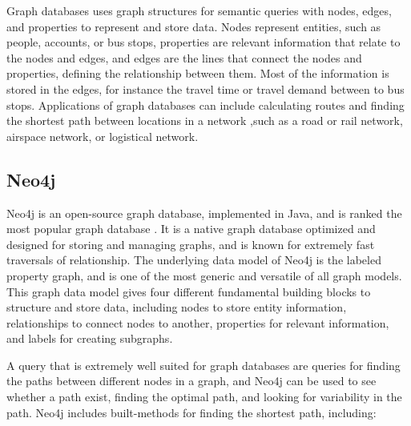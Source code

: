 Graph databases uses graph structures for semantic queries with nodes, edges, and properties to represent and store data.
Nodes represent entities, such as people, accounts, or bus stops, properties are relevant information that relate to the nodes and edges, and edges are the lines that connect the nodes and properties, defining the relationship between them. Most of the information is stored in the edges, for instance the travel time or travel demand between to bus stops. 
Applications of graph databases can include calculating routes and finding the shortest path between locations in a network ,such as a road or rail network, airspace network, or logistical network\citep[p.102]{robinson13}. 

\subsection{Neo4j}
\label{subsubsec:neo4j}
Neo4j\citep{website:neo4j} is an open-source graph database, implemented in Java, and is ranked the most popular graph database \citep{website:graphdbranking}. It is a native graph database optimized and designed for storing and managing graphs, and is known for extremely fast traversals of relationship. The underlying data model of Neo4j is the labeled property graph, and is one of the most generic and versatile of all graph models\citep[p.73]{robinson13}. This graph data model gives four different fundamental building blocks to structure and store data, including nodes to store entity information, relationships to connect nodes to another, properties for relevant information, and labels for creating subgraphs. 

A query that is extremely well suited for graph databases are queries for finding the paths between different nodes in a graph, and Neo4j can be used to see whether a path exist, finding the optimal path, and looking for variability in the path\citep[p. 51]{bruggen14}. Neo4j includes built-methods for finding the shortest path, including:


